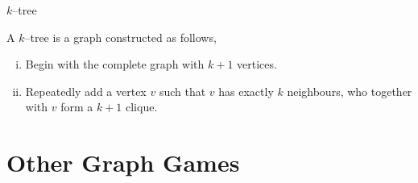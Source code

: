 \documentclass{beamer}
\begin{document}
\begin{frame}[noframenumbering]{\secname}{$k$--tree}
    
    
    
    A $k$--tree is a graph constructed as follows,
    \begin{enumerate}[(i)]
        \item Begin with the complete graph with $k+1$ vertices.
        \item Repeatedly add a vertex $v$ such that $v$ has exactly $k$ neighbours, who together with $v$ form a $k+1$ clique.
    \end{enumerate}
    
\end{frame}



\section{Other Graph Games}

\end{document}
